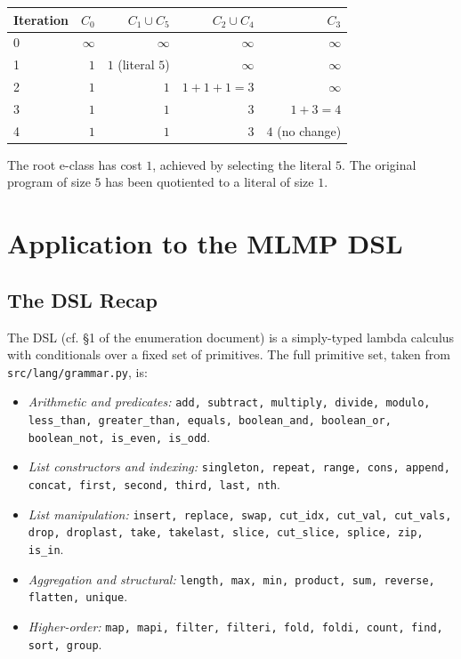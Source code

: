 \documentclass[11pt,a4paper]{article}
\begin{document}
\begin{center}
\begin{tabular}{lrrrr}
\toprule
Iteration & $C_0$ & $C_1 \cup C_5$ & $C_2 \cup C_4$ & $C_3$ \\
\midrule
0 & $\infty$ & $\infty$ & $\infty$ & $\infty$ \\
1 & $1$ & $1$ (literal $5$) & $\infty$ & $\infty$ \\
2 & $1$ & $1$ & $1 + 1 + 1 = 3$ & $\infty$ \\
3 & $1$ & $1$ & $3$ & $1 + 3 = 4$ \\
4 & $1$ & $1$ & $3$ & $4$ (no change) \\
\bottomrule
\end{tabular}
\end{center}

The root e-class has cost $1$, achieved by selecting the literal $5$. The original program of size $5$ has been quotiented to a literal of size $1$.

\section{Application to the MLMP DSL}\label{sec:mlmp}

\subsection{The DSL Recap}\label{sec:dsl-recap}

The DSL (cf. §1 of the enumeration document) is a simply-typed lambda calculus with conditionals over a fixed set of primitives. The full primitive set, taken from \texttt{src/lang/grammar.py}, is:

\begin{itemize}
\item \textit{Arithmetic and predicates:} \texttt{add, subtract, multiply, divide, modulo, less\_than, greater\_than, equals, boolean\_and, boolean\_or, boolean\_not, is\_even, is\_odd}.
\item \textit{List constructors and indexing:} \texttt{singleton, repeat, range, cons, append, concat, first, second, third, last, nth}.
\item \textit{List manipulation:} \texttt{insert, replace, swap, cut\_idx, cut\_val, cut\_vals, drop, droplast, take, takelast, slice, cut\_slice, splice, zip, is\_in}.
\item \textit{Aggregation and structural:} \texttt{length, max, min, product, sum, reverse, flatten, unique}.
\item \textit{Higher-order:} \texttt{map, mapi, filter, filteri, fold, foldi, count, find, sort, group}.
\end{itemize}
\end{document}
